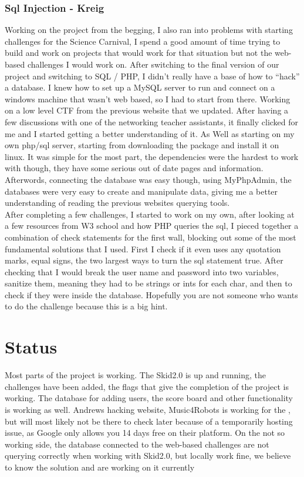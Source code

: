 \documentclass[runningheads,a4paper]{llncs}
\begin{document}
\subsubsection{Sql Injection - Kreig}
Working on the project from the begging, I also ran into problems with starting challenges for the Science Carnival, I spend a good amount of time trying to build and work on projects that would work for that situation but not the web-based challenges I would work on. After switching to the final version of our project and switching to SQL / PHP, I didn’t really have a base of how to “hack” a database. I knew how to set up a MySQL server to run and connect on a windows machine that wasn’t web based, so I had to start from there. Working on a low level CTF from the previous website that we updated. After having a few discussions with one of the networking teacher assistants, it finally clicked for me and I started getting a better understanding of it. As Well as starting on my own php/sql server, starting from downloading the package and install it on linux. It was simple for the most part, the dependencies were the hardest to work with though, they have some serious out of date pages and information. Afterwords, connecting the database was easy though, using MyPhpAdmin, the databases were very easy to create and manipulate data, giving me a better understanding of reading the previous websites querying tools.\\
After completing a few challenges, I started to work on my own, after looking at a few resources from W3 school and how PHP queries the sql, I pieced together a combination of check statements for the first wall, blocking out some of the most fundamental solutions that I used. First I check if it even uses any quotation marks, equal signs, the two largest ways to turn the sql statement true. After checking that I would break the user name and password into two variables, sanitize them, meaning they had to be strings or ints for each char, and then to check if they were inside the database. Hopefully you are not someone who wants to do the challenge because this is a big hint.




\section{Status}
Most parts of the project is working. The Skid2.0 is up and running, the challenges have been added, the flags that give the completion of the project is working. The database for adding users, the score board and other functionality is working as well. Andrews hacking website, Music4Robots is working for the , but will most likely not be there to check later because of a temporarily hosting issue, as Google only allows you 14 days free on their platform. On the not so working side, the database connected to the web-based challenges are not querying correctly when working with Skid2.0, but locally work fine, we believe to know the solution and are working on it currently
\end{document}
